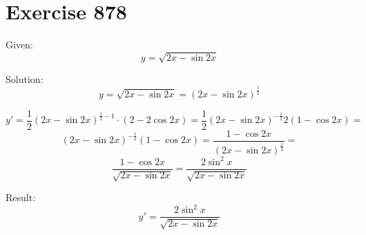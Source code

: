 \documentclass[a4paper, 10pt]{scrartcl}
\begin{document}
\section{Exercise 878}

Given:
\[
y = \sqrt{2x - \sin{2x}}
\]

Solution:
\[
y = \sqrt{2x - \sin{2x}} = (2x - \sin{2x})^{\frac{1}{2}}
\]

\[
y' = \frac{1}{2}(2x - \sin{2x})^{\frac{1}{2} - 1}\cdot(2 - 2\cos{2x}) = \frac{1}{2}(2x - \sin{2x})^{-\frac{1}{2}}2(1 - \cos{2x}) =
\]
\[
(2x - \sin{2x})^{-\frac{1}{2}}(1 - \cos{2x}) = \frac{1 - \cos{2x}}{(2x - \sin{2x})^{\frac{1}{2}}} =
\]
\[
\frac{1 - \cos{2x}}{\sqrt{2x - \sin{2x}}} = \frac{2\sin^{2}{x}}{\sqrt{2x - \sin{2x}}}
\]

Result:
\[
y' = \frac{2\sin^{2}{x}}{\sqrt{2x - \sin{2x}}}
\]
\end{document}
